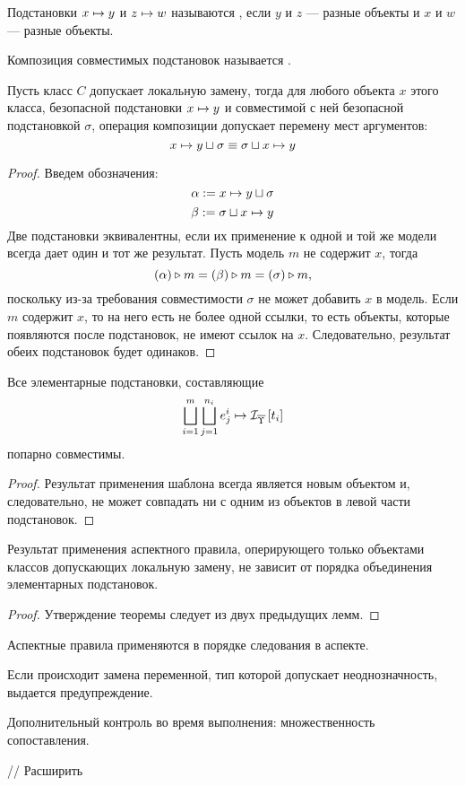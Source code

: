 \begin{Def}
Подстановки $x \mapsto y$ и $z \mapsto w$ называются , если $y$ и $z$ --- разные объекты и $x$ и $w$ --- разные объекты.

Композиция совместимых подстановок называется .
\end{Def}

\begin{Lemm}
Пусть класс $C$ допускает локальную замену, тогда для любого объекта $x$ этого класса, безопасной подстановки $x \mapsto y$ и совместимой с ней безопасной подстановкой $\sigma$, операция композиции допускает перемену мест аргументов:
$$
	x \mapsto y \sqcup \sigma \equiv \sigma \sqcup x \mapsto y 
$$
\end{Lemm}
\begin{proof}
Введем обозначения:
$$\alpha := x \mapsto y \sqcup \sigma$$
$$\beta := \sigma \sqcup x \mapsto y$$
Две подстановки эквивалентны, если их применение к одной и той же модели всегда дает один и тот же результат. Пусть модель $m$ не содержит $x$, тогда
$$\left( \alpha \right) \triangleright m = \left( \beta \right) \triangleright m = \left( \sigma \right) \triangleright m,$$
поскольку из-за требования совместимости $\sigma$ не может добавить $x$ в модель.
Если $m$ содержит $x$, то на него есть не более одной ссылки, то есть объекты, которые появляются после подстановок, не имеют ссылок на $x$. Следовательно, результат обеих подстановок будет одинаков.
\end{proof}

\begin{Lemm}
Все элементарные подстановки, составляющие 
$$
\bigsqcup\limits_{i=1}^{m} \bigsqcup\limits_{j=1}^{n_i}
			e^i_j \mapsto \mathcal{I}_{\overline{\Upsilon}} \left[ t_i \right]
$$
попарно совместимы.
\end{Lemm}
\begin{proof}
Результат применения шаблона всегда является новым объектом и, следовательно, не может совпадать ни с одним из объектов в левой части подстановок.
\end{proof}

\begin{Th}
Результат применения аспектного правила, оперирующего только объектами классов допускающих локальную замену, не зависит от порядка объединения элементарных подстановок.
\end{Th}
\begin{proof}
Утверждение теоремы следует из двух предыдущих лемм.
\end{proof}

Аспектные правила применяются в порядке следования в аспекте.

Если происходит замена переменной, тип которой допускает неоднозначность, выдается предупреждение.

Дополнительный контроль во время выполнения: множественность сопоставления. 

// Расширить
